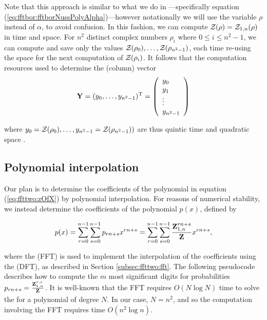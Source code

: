 Note that this approach is similar to what we do in \fftbor---specifically
equation
(\ref{eq:fftbor:fftborNussPolyAlpha})---however notationally we will use the
variable $\rho$ instead of $\alpha$, to avoid confusion. In this fashion, we
can compute ${\mathcal Z}_{}(\rho)={\mathcal Z}_{1,n}(\rho)$ in
 time and  space. For $n^2$ distinct complex numbers
$\rho_i$ where $0 \leq i \leq n^2-1$, we can compute and save only the
values ${\mathcal Z}_{}(\rho_0),\dots,{\mathcal Z}_{}(\rho_{n^2-1})$, each time re-using the
 space for the next computation of ${\mathcal Z}_{}(\rho_i)$.
It follows that
the computation resources used to determine the (column) vector
\begin{align}
\label{eq:ffttwo:yColumn}
\bfY = (y_0,\dots,y_{n^2-1})^{\text T} =
\left(
\begin{array}{l}
y_0 \\
y_1 \\
\vdots \\
y_{n^2-1} \\
\end{array}
\right)
\end{align}

where $y_0={\mathcal Z}_{}(\rho_0),\dots,y_{n^2-1}={\mathcal Z}_{}(\rho_{n^2-1}))$ are thus
quintic time  and quadratic space .

\subsection{Polynomial interpolation}
Our plan is to determine the coefficients of the polynomial
\emZ{} in equation (\ref{eq:ffttwo:zOfX}) by
polynomial interpolation.  For reasons of numerical stability,
we instead determine the coefficients of the polynomial $p(x)$,
defined by

\begin{align}
\label{eq:ffttwo:pOfX}
p(x) =
\sum_{r=0}^{n-1} \sum_{s=0}^{n-1} p_{rn+s}
 x^{rn+s} =
\sum_{r=0}^{n-1} \sum_{s=0}^{n-1} \frac{\bfZ{rn+s}{1,n}}{\bfZ{}{}}
 x^{rn+s},
\end{align}

where the \fft (FFT) is used to implement the
interpolation of
the coefficients using the \idft (DFT), as
described in Section \ref{subsec:ffttwo:fft}.  The following pseudocode
describes how
to compute the $m$ most significant digits
for probabilities
$p_{rn+s} = \frac{{\bf Z}^{r,s}_{1,n}}{{\bf Z}^{}_{}}$. It is well-known that
the FFT requires $O(N \log N)$ time to solve the \idft for a polynomial
of degree $N$. In our case,
$N=n^2$, and so the computation involving the FFT requires time $O(n^2 \log n)$.

